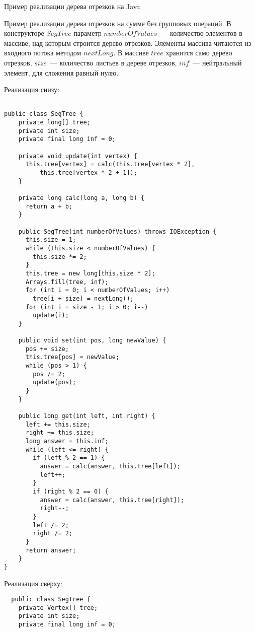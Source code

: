 ﻿\begin{section}{Пример реализации дерева отрезков на Java}

Пример реализации дерева отрезков на сумме без групповых операций.
В конструкторе $SegTree$ параметр $numberOfValues$~--- количество элементов 
в массиве, над которым строится дерево отрезков. Элементы массива читаются
из входного потока методом $nextLong$. В массиве $tree$ хранится само дерево отрезков,
$size$~--- количество листьев в дереве отрезков, $inf$~--- нейтральный элемент,
для сложения равный нулю.

Реализация снизу:

\begin{lstlisting}

public class SegTree {
    private long[] tree;
    private int size;
    private final long inf = 0;

    private void update(int vertex) {
      this.tree[vertex] = calc(this.tree[vertex * 2],
          this.tree[vertex * 2 + 1]);
    }

    private long calc(long a, long b) {
      return a + b;
    }

    public SegTree(int numberOfValues) throws IOException {
      this.size = 1;
      while (this.size < numberOfValues) {
        this.size *= 2;
      }
      this.tree = new long[this.size * 2];
      Arrays.fill(tree, inf);
      for (int i = 0; i < numberOfValues; i++)
        tree[i + size] = nextLong();
      for (int i = size - 1; i > 0; i--)
        update(i);
    }

    public void set(int pos, long newValue) {
      pos += size;
      this.tree[pos] = newValue;
      while (pos > 1) {
        pos /= 2;
        update(pos);
      }
    }

    public long get(int left, int right) {
      left += this.size;
      right += this.size;
      long answer = this.inf;
      while (left <= right) {
        if (left % 2 == 1) {
          answer = calc(answer, this.tree[left]);
          left++;
        }
        if (right % 2 == 0) {
          answer = calc(answer, this.tree[right]);
          right--;
        }
        left /= 2;
        right /= 2;
      }
      return answer;
    }
}

\end{lstlisting}

\newpage
Реализация сверху:

\begin{lstlisting}
  public class SegTree {
    private Vertex[] tree;
    private int size;
    private final long inf = 0;


\end{lstlisting}
\end{section}
